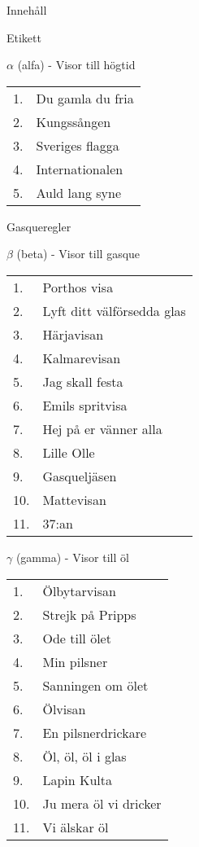 \documentclass[a6paper,10pt]{article}
\begin{document}
\noindent \huge Innehåll

\vspace{5pt}

\noindent \Large Etikett 

\vspace{5pt}

\noindent \Large $\alpha$ (alfa) - Visor till högtid

\normalsize
\noindent
\begin{tabularx}{0.55\textwidth}{l X}
1.&Du gamla du fria\\
2.&Kungssången\\
3.&Sveriges flagga\\
4.&Internationalen\\
5.&Auld lang syne
\end{tabularx}

\vspace{5pt}

\noindent \Large Gasqueregler

\vspace{5pt}

\noindent \Large $\beta$ (beta) - Visor till gasque

\noindent
\normalsize
\begin{tabularx}{0.65\textwidth}{l X}
1.&Porthos visa\\
2.&Lyft ditt välförsedda glas\\
3.&Härjavisan\\
4.&Kalmarevisan\\
5.&Jag skall festa \\
6.&Emils spritvisa\\
7.&Hej på er vänner alla\\
8.&Lille Olle\\
9.&Gasqueljäsen\\
10.&Mattevisan\\
11.&37:an
\end{tabularx}

\newpage

\noindent \Large $\gamma$ (gamma) - Visor till öl

\noindent
\normalsize
\begin{tabularx}{0.65\textwidth}{l X}
1.&Ölbytarvisan\\
2.&Strejk på Pripps\\
3.&Ode till ölet\\
4.&Min pilsner\\
5.&Sanningen om ölet \\
6.&Ölvisan\\
7.&En pilsnerdrickare\\
8.&Öl, öl, öl i glas\\
9.&Lapin Kulta\\
10.&Ju mera öl vi dricker\\
11.&Vi älskar öl
\end{tabularx}
\end{document}
